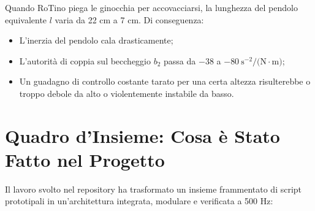 \documentclass[11pt,a4paper]{article}
\begin{document}
\begin{tcolorbox}[title=Trappola 4: La Dinamica Cambia quando il Robot si Abbassa (VL-WIP)]
Quando RoTino piega le ginocchia per accovacciarsi, la lunghezza del pendolo equivalente $l$ varia da 22 cm a 7 cm. Di conseguenza:
\begin{itemize}
    \item L'inerzia del pendolo cala drasticamente;
    \item L'autorità di coppia sul beccheggio $b_2$ passa da $-38$ a $-80\ \text{s}^{-2}\text{/(N}\cdot\text{m)}$;
    \item Un guadagno di controllo costante tarato per una certa altezza risulterebbe o troppo debole da alto o violentemente instabile da basso.
\end{itemize}
\end{tcolorbox}

\section{Quadro d'Insieme: Cosa è Stato Fatto nel Progetto}

Il lavoro svolto nel repository ha trasformato un insieme frammentato di script prototipali in un'architettura integrata, modulare e verificata a 500 Hz:
\end{document}
